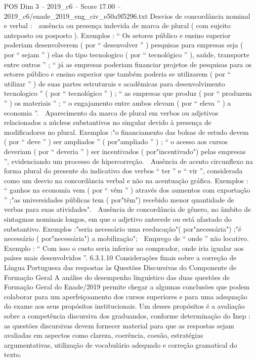 \begin{textsample}{POS Dim 3 – 2019\_c6 – Score 17.00 – 2019\_c6/enade\_2019\_eng\_civ\_e50a9f5296.txt}
Desvios de concordância nominal e verbal :  ausência ou presença indevida de marca de plural ( com sujeito anteposto ou posposto ).
Exemplos : “ Os setores público e ensino superior poderiam desenvolverem ( por “ desenvolver ” ) pesquisas para empresas seja ( por “ sejam ” ) elas do tipo tecnologico ( por “ tecnológico ” ), saúde, transporte entre outros ” ; “ já as empresas poderiam financiar projetos de pesquisas para os setores público e ensino superior que também poderia se utilizarem ( por “ utilizar ” ) de suas partes estruturais e acadêmicas para desenvolvimento tecnologico ” ( por “ tecnológico ” ) ; “ as empresas que produz ( por “ produzem ” ) os materiais ” ; “ o engajamento entre ambos elevam ( por “ eleva ” ) a economia ”.  Aparecimento da marca de plural em verbos ou adjetivos relacionados a núcleos substantivos no singular devido à presença de modificadores no plural.
Exemplos :"o financiamento das bolsas de estudo devem ( por “ deve ” ) ser ampliados ” ( por"ampliado ” ) ; “ o acesso aos cursos deveriam ( por “ deveria ” ) ser incentivados ( por"incentivado") pelas empresas ”, evidenciando um processo de hipercorreção.  Ausência de acento circunflexo na forma plural do presente do indicativo dos verbos “ ter ” e “ vir ”, considerada como um desvio na concordância verbal e não na acentuação gráfica.
Exemplos : “ ganhos na economia vem ( por “ vêm ” ) através dos aumentos com exportação ” ;"as universidades públicas tem ( por"têm") recebido menor quantidade de verbas para suas atividades".  Ausência de concordância de gênero, no âmbito de sintagmas nominais longos, em que o adjetivo antecede ou está afastado do substantivo.
Exemplos :"seria necessário uma reeducação"( por"necessária") ;"é necessário ( por"necessária") a mobilização";  Emprego de “ onde ” não locativo.
Exemplo : “ Com isso o custo seria inferior ao comprador, onde iria igualar aos países mais desenvolvidos ”. 6.3.1.10 Considerações finais sobre a correção de Língua Portuguesa das respostas às Questões Discursivas do Componente de Formação Geral A análise do desempenho linguístico das duas questões de Formação Geral do Enade/2019 permite chegar a algumas conclusões que podem colaborar para um aperfeiçoamento dos cursos superiores e para uma adequação do exame aos seus propósitos institucionais.
Um desses propósitos é a avaliação sobre a competência discursiva dos graduandos, conforme determinação do Inep : as questões discursivas devem fornecer material para que as respostas sejam avaliadas em aspectos como clareza, coerência, coesão, estratégias argumentativas, utilização de vocabulário adequado e correção gramatical do texto.

\end{textsample}
